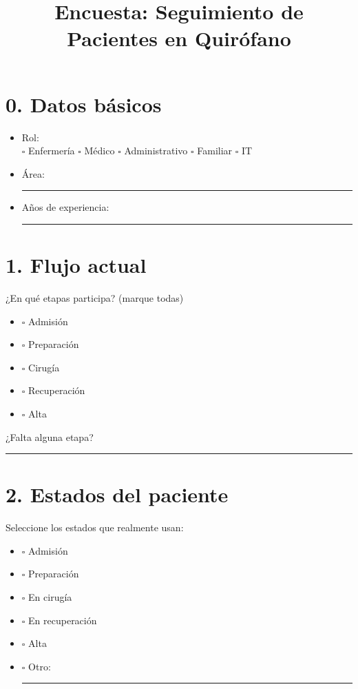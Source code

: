 \documentclass[12pt]{article}
\title{Encuesta: Seguimiento de Pacientes en Quirófano}
\date{}
\begin{document}
\maketitle

\section*{0. Datos básicos}
\begin{itemize}
    \item Rol: \\
    $\square$ Enfermería \quad
    $\square$ Médico \quad
    $\square$ Administrativo \quad
    $\square$ Familiar \quad
    $\square$ IT

    \item Área: \rule{10cm}{0.4pt}

    \item Años de experiencia: \rule{5cm}{0.4pt}
\end{itemize}

\section*{1. Flujo actual}
¿En qué etapas participa? (marque todas)
\begin{itemize}
    \item $\square$ Admisión
    \item $\square$ Preparación
    \item $\square$ Cirugía
    \item $\square$ Recuperación
    \item $\square$ Alta
\end{itemize}

¿Falta alguna etapa? \\
\rule{14cm}{0.4pt}

\section*{2. Estados del paciente}
Seleccione los estados que realmente usan:
\begin{itemize}
    \item $\square$ Admisión
    \item $\square$ Preparación
    \item $\square$ En cirugía
    \item $\square$ En recuperación
    \item $\square$ Alta
    \item $\square$ Otro: \rule{5cm}{0.4pt}
\end{itemize}
\end{document}
